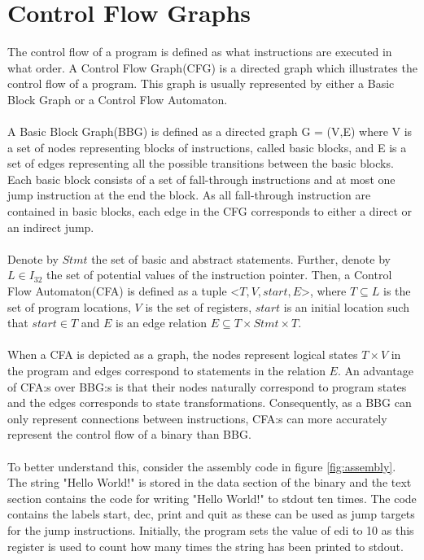 \documentclass{kththesis}
\begin{document}
\section{Control Flow Graphs}
The control flow of a program is defined as what instructions are executed in what order. A Control Flow Graph(CFG) is a directed graph which illustrates the control flow of a program. This graph is usually represented by either a Basic Block Graph or a Control Flow Automaton.
\\ \\
A Basic Block Graph(BBG) is defined as a directed graph G = (V,E) where V is a set of nodes representing blocks of instructions, called basic blocks, and E is a set of edges representing all the possible transitions between the basic blocks. Each basic block consists of a set of fall-through instructions and at most one jump instruction at the end the block. As all fall-through instruction are contained in basic blocks, each edge in the CFG corresponds to either a direct or an indirect jump.
\\ \\ 
Denote by $Stmt$ the set of basic and abstract statements. Further, denote by $L \in I_{32}$ the set of potential values of the instruction pointer. Then, a Control Flow Automaton(CFA) is defined as a tuple <$T,V,start,E$>, where $T \subseteq L$ is the set of program locations, $V$ is the set of registers, $start$ is an initial location such that $start \in T$ and $E$ is an edge relation $E \subseteq T \times Stmt \times T$. 
\\ \\
When a CFA is depicted as a graph, the nodes represent logical states $T \times V$ in the program and edges correspond to statements in the relation $E$. An advantage of CFA:s over BBG:s is that their nodes naturally correspond to program states and the edges corresponds to state transformations\cite{Jakstab}. Consequently, as a BBG can only represent connections between instructions, CFA:s can more accurately represent the control flow of a binary than BBG. 
\\ \\
To better understand this, consider the assembly code in figure \ref{fig:assembly}. The string "Hello World!" is stored in the data section of the binary and the text section contains the code for writing "Hello World!" to stdout ten times. The code contains the labels start, dec, print and quit as these can be used as jump targets for the jump instructions. Initially, the program sets the value of edi to 10 as this register is used to count how many times the string has been printed to stdout.
\end{document}
